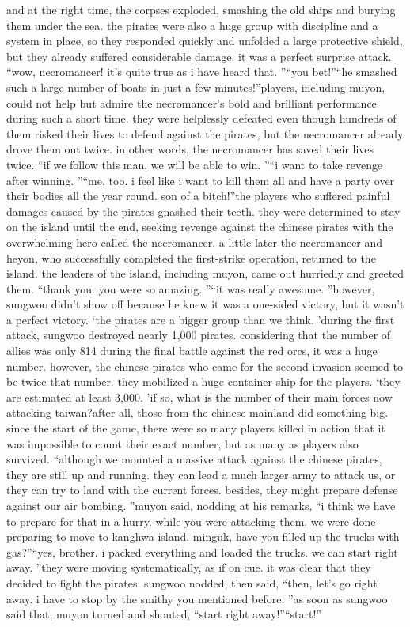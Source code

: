 and at the right time, the corpses exploded, smashing the old ships and burying them under the sea.
 the pirates were also a huge group with discipline and a system in place, so they responded quickly and unfolded a large protective shield, but they already suffered considerable damage.
it was a perfect surprise attack.
“wow, necromancer! it’s quite true as i have heard that.
”“you bet!”“he smashed such a large number of boats in just a few minutes!”players, including muyon, could not help but admire the necromancer’s bold and brilliant performance during such a short time.
they were helplessly defeated even though hundreds of them risked their lives to defend against the pirates, but the necromancer already drove them out twice.
 in other words, the necromancer has saved their lives twice.
“if we follow this man, we will be able to win.
”“i want to take revenge after winning.
”“me, too.
 i feel like i want to kill them all and have a party over their bodies all the year round.
 son of a bitch!”the players who suffered painful damages caused by the pirates gnashed their teeth.
they were determined to stay on the island until the end, seeking revenge against the chinese pirates with the overwhelming hero called the necromancer.
a little later the necromancer and heyon, who successfully completed the first-strike operation, returned to the island.
 the leaders of the island, including muyon, came out hurriedly and greeted them.
“thank you.
 you were so amazing.
”“it was really awesome.
”however, sungwoo didn’t show off because he knew it was a one-sided victory, but it wasn’t a perfect victory.
‘the pirates are a bigger group than we think.
’during the first attack, sungwoo destroyed nearly 1,000 pirates.
 considering that the number of allies was only 814 during the final battle against the red orcs, it was a huge number.
however, the chinese pirates who came for the second invasion seemed to be twice that number.
 they mobilized a huge container ship for the players.
‘they are estimated at least 3,000.
’if so, what is the number of their main forces now attacking taiwan?after all, those from the chinese mainland did something big.
 since the start of the game, there were so many players killed in action that it was impossible to count their exact number, but as many as players also survived.
“although we mounted a massive attack against the chinese pirates, they are still up and running.
 they can lead a much larger army to attack us, or they can try to land with the current forces.
 besides, they might prepare defense against our air bombing.
”muyon said, nodding at his remarks, “i think we have to prepare for that in a hurry.
 while you were attacking them, we were done preparing to move to kanghwa island.
 minguk, have you filled up the trucks with gas?”“yes, brother.
 i packed everything and loaded the trucks.
 we can start right away.
”they were moving systematically, as if on cue.
 it was clear that they decided to fight the pirates.
sungwoo nodded, then said, “then, let’s go right away.
 i have to stop by the smithy you mentioned before.
”as soon as sungwoo said that, muyon turned and shouted, “start right away!”“start!”

